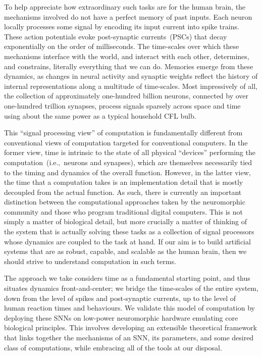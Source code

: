 To help appreciate how extraordinary such tasks are for the human brain, the mechanisms involved do not have a perfect memory of past inputs.
Each neuron locally processes some signal by encoding its input current into spike trains.
These action potentials evoke post-synaptic currents~(PSCs) that decay exponentially on the order of milliseconds.
The time-scales over which these mechanisms interface with the world, and interact with each other, determines, and constrains, literally everything that we can do.
Memories emerge from these dynamics, as changes in neural activity and synaptic weights reflect the history of internal representations along a multitude of time-scales.
Most impressively of all, the collection of approximately one-hundred billion neurons, connected by over one-hundred trillion synapses, process signals sparsely across space and time using about the same power as a typical household CFL bulb.

This ``signal processing view'' of computation is fundamentally different from conventional views of computation targeted for conventional computers.
In the former view, time is intrinsic to the state of all physical ``devices'' performing the computation~(i.e.,~neurons and synapses), which are themselves necessarily tied to the timing and dynamics of the overall function.
However, in the latter view, the time that a computation takes is an implementation detail that is mostly decoupled from the actual function.
As such, there is currently an important distinction between the computational approaches taken by the neuromorphic community and those who program traditional digital computers.
This is not simply a matter of biological detail, but more crucially a matter of thinking of the system that is actually solving these tasks as a collection of signal processors whose dynamics are coupled to the task at hand.
If our aim is to build artificial systems that are as robust, capable, and scalable as the human brain, then we should strive to understand computation in such terms.

The approach we take considers time as a fundamental starting point, and thus situates dynamics front-and-center; we bridge the time-scales of the entire system, down from the level of spikes and post-synaptic currents, up to the level of human reaction times and behaviours. 
We validate this model of computation by deploying these SNNs on low-power neuromorphic hardware emulating core biological principles.
This involves developing an extensible theoretical framework that links together the mechanisms of an SNN, its parameters, and some desired class of computations, while embracing all of the tools at our disposal.

